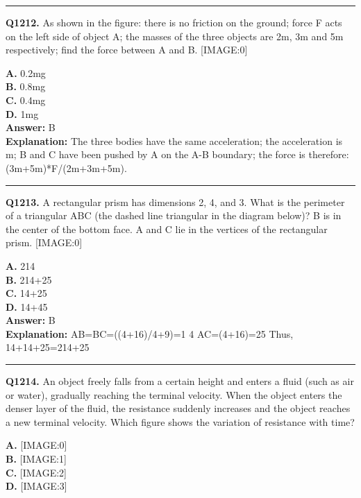 \documentclass[12pt]{article}
\begin{document}
\hrule
\vspace{1em}


\noindent
\textbf{Q1212.} As shown in the figure: there is no friction on the ground; force F acts on the left side of object A; the masses of the three objects are 2m, 3m and 5m respectively; find the force between A and B.
[IMAGE:0]



\textbf{A.} 0.2mg \\
\textbf{B.} 0.8mg \\
\textbf{C.} 0.4mg \\
\textbf{D.} 1mg \\

\textbf{Answer:} B \\
\textbf{Explanation:} The three bodies have the same acceleration; the acceleration is m; B and C have been pushed by A on the A-B boundary; the force is therefore: (3m+5m)*F/(2m+3m+5m).

\hrule
\vspace{1em}


\noindent
\textbf{Q1213.} A rectangular prism has dimensions 2, 4, and 3. What is the perimeter of a triangular ABC (the dashed line triangular in the diagram below)? B is in the center of the bottom face. A and C lie in the vertices of the rectangular prism.
[IMAGE:0]



\textbf{A.} 2\sqrt{}14 \\
\textbf{B.} 2\sqrt{}14+2\sqrt{}5 \\
\textbf{C.} \sqrt{}14+2\sqrt{}5 \\
\textbf{D.} \sqrt{}14+4\sqrt{}5 \\

\textbf{Answer:} B \\
\textbf{Explanation:} AB=BC=\sqrt{}((4+16)/4+9)=\sqrt{}1 4
AC=\sqrt{}(4+16)=2\sqrt{}5
Thus, \sqrt{}14+\sqrt{}14+2\sqrt{}5=2\sqrt{}14+2\sqrt{}5

\hrule
\vspace{1em}


\noindent
\textbf{Q1214.} An object freely falls from a certain height and enters a fluid (such as air or water), gradually reaching the terminal velocity. When the object enters the denser layer of the fluid, the resistance suddenly increases and the object reaches a new terminal velocity. Which figure shows the variation of resistance with time?



\textbf{A.} [IMAGE:0] \\
\textbf{B.} [IMAGE:1] \\
\textbf{C.} [IMAGE:2] \\
\textbf{D.} [IMAGE:3] \\
\end{document}
